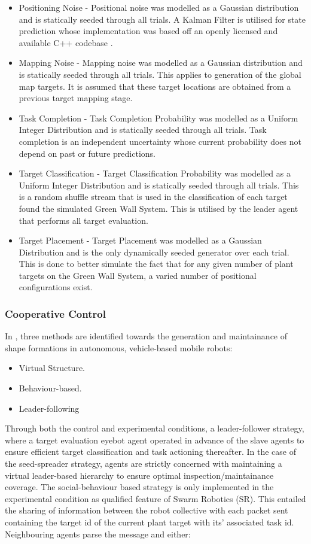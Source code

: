 \documentclass{report}
\begin{document}
\begin{itemize}
	\item Positioning Noise - Positional noise was modelled as a Gaussian distribution and is statically seeded through all trials. A Kalman Filter is utilised for state prediction whose implementation was based off an openly licensed and available C++ codebase \cite{KALMAN2015}.
	\item Mapping Noise - Mapping noise was modelled as a Gaussian distribution and is statically seeded through all trials. This applies to generation of the global map targets. It is assumed that these target locations are obtained from a previous target mapping stage.
	\item Task Completion - Task Completion Probability was modelled as a Uniform Integer Distribution and is statically seeded through all trials. Task completion is an independent uncertainty whose current probability does not depend on past or future predictions.
	\item Target Classification - Target Classification Probability was modelled as a Uniform Integer Distribution and is statically seeded through all trials. This is a random shuffle stream that is used in the classification of each target found the simulated Green Wall System. This is utilised by the leader agent that performs all target evaluation.
	\item Target Placement - Target Placement was modelled as a Gaussian Distribution and is the only dynamically seeded generator over each trial. This is done to better simulate the fact that for any given number of plant targets on the Green Wall System, a varied number of positional configurations exist.
\end{itemize}

\subsubsection{Cooperative Control}
In \cite{Macas2009}, three methods are identified towards the generation and maintainance of shape formations in autonomous, vehicle-based mobile robots:
\begin{itemize}
	\item Virtual Structure.
	\item Behaviour-based.
	\item Leader-following
\end{itemize}
Through both the control and experimental conditions, a leader-follower strategy, where a target evaluation eyebot agent operated in advance of the slave agents to ensure efficient target classification and task actioning thereafter. In the case of the seed-spreader strategy, agents are strictly concerned with maintaining a virtual leader-based hierarchy to ensure optimal inspection/maintainance coverage. The social-behaviour based strategy is only implemented in the experimental condition as qualified feature of Swarm Robotics (SR). This entailed the sharing of information between the robot collective with each packet sent containing the target id of the current plant target with its' associated task id. Neighbouring agents parse the message and either:
\end{document}
